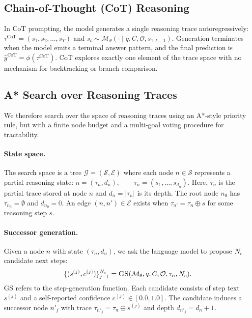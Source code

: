 \documentclass[11pt]{article}
\begin{document}
\subsection{Chain-of-Thought (CoT) Reasoning}
\label{sec:cot}

In CoT prompting, the model generates a single reasoning trace autoregressively: $\tau^{\text{CoT}} = (s_1, s_2, \ldots, s_T)$ and $s_t \sim \mathcal{M}_\theta(\cdot \mid q, C, \mathcal{O}, s_{1:t-1})$.
Generation terminates when the model emits a terminal answer pattern, and the final prediction is $\hat{y}^{\text{CoT}} = \phi(\tau^{\text{CoT}})$. CoT explores exactly one element of the trace space with no mechanism for backtracking or branch comparison.

\subsection{A* Search over Reasoning Traces}
\label{sec:astar}

We therefore search over the space of reasoning traces using an A*-style priority rule, but with a finite node budget and a multi-goal voting procedure for tractability.

\paragraph{State space.}
The search space is a tree $\mathcal{G} = (\mathcal{S}, \mathcal{E})$ where each node $n \in \mathcal{S}$ represents a partial reasoning state: $n = (\tau_n, d_n), \qquad \tau_n = (s_1, \ldots, s_{d_n})$. Here, $\tau_n$ is the partial trace stored at node $n$ and $d_n = |\tau_n|$ is its depth. The root node $n_0$ has $\tau_{n_0} = \emptyset$ and $d_{n_0} = 0$. An edge $(n,n') \in \mathcal{E}$ exists when $\tau_{n'} = \tau_n \oplus s$ for some reasoning step $s$.

\paragraph{Successor generation.}
Given a node $n$ with state $(\tau_n, d_n)$, we ask the language model to propose $N_c$ candidate next steps:
\begin{equation}
\{(s^{(j)}, c^{(j)})\}_{j=1}^{N_c} = \textsc{GS}(\mathcal{M}_\theta, q, C, \mathcal{O}, \tau_n, N_c).
\label{eq:successor}
\end{equation}
\textsc{GS} refers to the step-generation function. Each candidate consists of step text $s^{(j)}$ and a self-reported confidence $c^{(j)} \in [0.0,1.0]$. The candidate induces a successor node $n'_j$ with trace $\tau_{n'_j} = \tau_n \oplus s^{(j)}$ and depth $d_{n'_j} = d_n + 1$.
\end{document}
